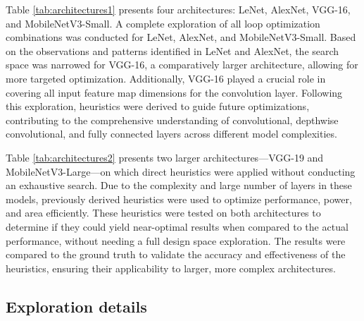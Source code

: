 Table \ref{tab:architectures1} presents four architectures: LeNet, AlexNet, VGG-16, and MobileNetV3-Small. A complete exploration of all loop optimization combinations was conducted for LeNet, AlexNet, and MobileNetV3-Small. Based on the observations and patterns identified in LeNet and AlexNet, the search space was narrowed for VGG-16, a comparatively larger architecture, allowing for more targeted optimization. Additionally, VGG-16 played a crucial role in covering all input feature map dimensions for the convolution layer. Following this exploration, heuristics were derived to guide future optimizations, contributing to the comprehensive understanding of convolutional, depthwise convolutional, and fully connected layers across different model complexities.
\\
\begin{table}[H]
\caption{Architectures on which heuristics are tested}
\label{tab:architectures2}
\centering
{}
\end{table}

Table \ref{tab:architectures2} presents two larger architectures—VGG-19 and MobileNetV3-Large—on which direct heuristics were applied without conducting an exhaustive search. Due to the complexity and large number of layers in these models, previously derived heuristics were used to optimize performance, power, and area efficiently. These heuristics were tested on both architectures to determine if they could yield near-optimal results when compared to the actual performance, without needing a full design space exploration. The results were compared to the ground truth to validate the accuracy and effectiveness of the heuristics, ensuring their applicability to larger, more complex architectures.

\subsection{Exploration details}

